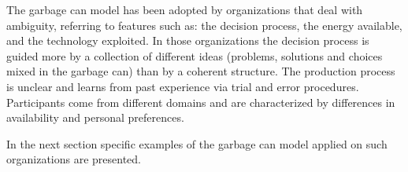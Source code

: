 The garbage can model has been adopted by organizations that deal with ambiguity, referring to features such as: the decision process, the energy available, and the technology exploited. In those organizations the decision process is guided more by a collection of different ideas (problems, solutions and choices mixed in the garbage can) than by a coherent structure. The production process is unclear and learns from past experience via trial and error procedures. Participants come from different domains and are characterized by differences in availability and personal preferences.

In the next section specific examples of the garbage can model applied on such organizations are presented.
